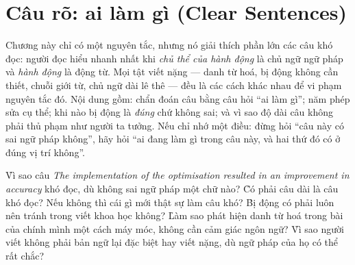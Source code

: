 \documentclass[../../english.tex]{subfiles}
\begin{document}
\chapter{Câu rõ: ai làm gì (Clear Sentences)}

\begin{tomtat}
Chương này chỉ có một nguyên tắc, nhưng nó giải thích phần lớn các câu khó đọc: người đọc hiểu nhanh nhất khi \emph{chủ thể của hành động} là chủ ngữ ngữ pháp và \emph{hành động} là động từ. Mọi tật viết nặng --- danh từ hoá, bị động không cần thiết, chuỗi giới từ, chủ ngữ dài lê thê --- đều là các cách khác nhau để vi phạm nguyên tắc đó. Nội dung gồm: chẩn đoán câu bằng câu hỏi ``ai làm gì''; năm phép sửa cụ thể; khi nào bị động là \emph{đúng} chứ không sai; và vì sao độ dài câu không phải thủ phạm như người ta tưởng. Nếu chỉ nhớ một điều: đừng hỏi ``câu này có sai ngữ pháp không'', hãy hỏi ``ai đang làm gì trong câu này, và hai thứ đó có ở đúng vị trí không''.
\end{tomtat}

\begin{nentang}
\end{nentang}

\begin{khoigoi}
\h{Vì sao câu \emph{The implementation of the optimisation resulted in an improvement in accuracy} khó đọc, dù không sai ngữ pháp một chữ nào?}
\h{Có phải câu dài là câu khó đọc? Nếu không thì cái gì mới thật sự làm câu khó?}
\h{Bị động có phải luôn nên tránh trong viết khoa học không?}
\h{Làm sao phát hiện danh từ hoá trong bài của chính mình một cách máy móc, không cần cảm giác ngôn ngữ?}
\h{Vì sao người viết không phải bản ngữ lại đặc biệt hay viết nặng, dù ngữ pháp của họ có thể rất chắc?}
\end{khoigoi}
\end{document}
